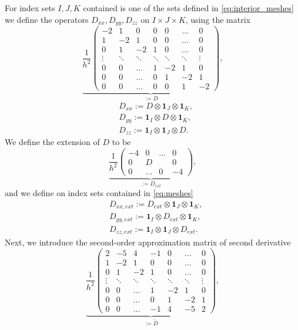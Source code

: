 \documentclass[12pt,reqno]{amsart}
\theoremstyle{definition}
\numberwithin{equation}{section}
\begin{document}
For  index sets $I,J,K$  contained is one of the sets defined in \eqref{eq:interior_meshes}
 we define the operators $D_{xx},D_{yy},D_{zz}$ on $I\times J\times K$, using the matrix 
$$
	\underbrace{
	\frac{1}{h^2}
	\begin{pmatrix}
		-2     & 1     & 0      & 0     & 0      & \dots  & 0      \\
		1     & -2     & 1      & 0      & 0      & \dots  & 0      \\
		0      & 1      & -2     & 1      & 0      & \dots  & 0      \\
		\vdots & \ddots & \ddots & \ddots & \ddots & \ddots & \vdots \\
		0      & 0      & \dots  & 1      & -2     & 1      & 0      \\
		0      & 0      & \dots  & 0      & 1      & -2    & 1      \\
		0      & 0      & \dots  & 0     & 0      & 1     & -2
\end{pmatrix}}_{:=D},
$$
\begin{align*}
	&
	D_{xx}:=D\otimes \mathbf{1}_J\otimes \mathbf{1}_K,\\&
D_{yy}:= \mathbf{1}_I\otimes D\otimes \mathbf{1}_K, \\&
D_{zz}:= \mathbf{1}_I\otimes \mathbf{1}_J\otimes D.
\end{align*}
We define the extension of $D$ to be 
$$
\underbrace{
	\frac{1}{h^2}
	\begin{pmatrix}
		-4     & 0&\dots& 0  \\
		0&D &&0\\
		0&\dots&0&-4
		\end{pmatrix}}_{:=D_{ext}},
$$
and we define on index sets contained in \eqref{eq:meshes}
\begin{align}\label{eq:ext}
	&
	D_{xx,ext}:=D_{ext}\otimes \mathbf{1}_J\otimes \mathbf{1}_K,\\& \nonumber
D_{yy,ext}:= \mathbf{1}_I\otimes D_{ext}\otimes \mathbf{1}_K, \\& \nonumber
D_{zz,ext}:= \mathbf{1}_I\otimes \mathbf{1}_J\otimes D_{ext}. \nonumber
\end{align}
Next, we introduce the second-order approximation matrix of second derivative 
$$
\underbrace{
	\frac{1}{h^2}
	\begin{pmatrix}
		2     & -5     & 4      & -1     & 0      & \dots  & 0      \\
		1     & -2     & 1      & 0      & 0      & \dots  & 0      \\
		0      & 1      & -2     & 1      & 0      & \dots  & 0      \\
		\vdots & \ddots & \ddots & \ddots & \ddots & \ddots & \vdots \\
		0      & 0      & \dots  & 1      & -2     & 1      & 0      \\
		0      & 0      & \dots  & 0      & 1      & -2    & 1      \\
		0      & 0      & \dots  & -1    & 4      & -5     & 2
\end{pmatrix}}_{:=\tilde{D}},
$$
\end{document}
